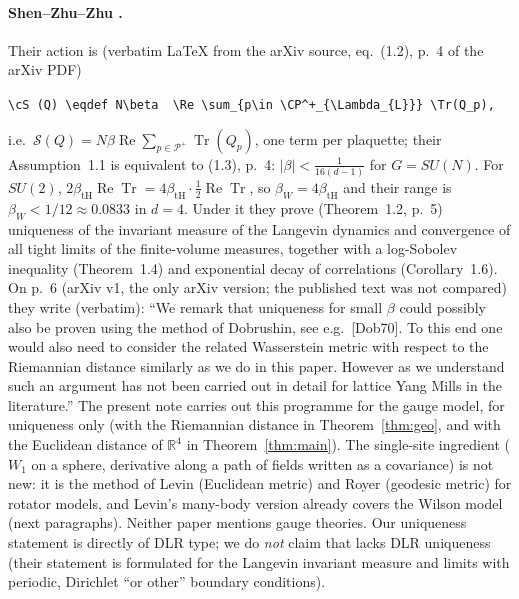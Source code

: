 \documentclass[11pt,a4paper]{article}
\theoremstyle{remark}
\theoremstyle{definition}
\newcommand{\R}{\mathbb{R}}
\newcommand{\ReTr}{\operatorname{Re}\operatorname{Tr}}
\begin{document}
\paragraph{Shen--Zhu--Zhu \cite{SZZ23}.} Their action is (verbatim LaTeX from the arXiv source, eq.~(1.2),
p.~4 of the arXiv PDF)
\begin{center}\small\verb|\cS (Q) \eqdef N\beta  \Re \sum_{p\in \CP^+_{\Lambda_{L}}} \Tr(Q_p),|\end{center}
i.e.\ $\mathcal S(Q)=N\beta\operatorname{Re}\sum_{p\in\mathcal P^+}\operatorname{Tr}(Q_p)$, one term per plaquette; their
Assumption~1.1 is equivalent to (1.3), p.~4: $|\beta|<\frac{1}{16(d-1)}$ for $G=SU(N)$. For $SU(2)$,
$2\beta_{\mathrm{tH}}\ReTr=4\beta_{\mathrm{tH}}\cdot\frac12\ReTr$, so $\beta_W=4\beta_{\mathrm{tH}}$ and their range is
$\beta_W<1/12\approx0.0833$ in $d=4$. Under it they prove (Theorem~1.2, p.~5) uniqueness of the invariant
measure of the Langevin dynamics and convergence of all tight limits of the finite-volume measures, together
with a log-Sobolev inequality (Theorem~1.4) and exponential decay of correlations (Corollary~1.6).
On p.~6 (arXiv v1, the only arXiv version; the published text was not compared) they write (verbatim): ``We remark that uniqueness for small $\beta$ could possibly also be proven
using the method of Dobrushin, see e.g.\ [Dob70]. To this end one would also need to consider the related
Wasserstein metric with respect to the Riemannian distance similarly as we do in this paper. However as we
understand such an argument has not been carried out in detail for lattice Yang Mills in the literature.''
The present note carries out this programme for the gauge model, for uniqueness only (with the Riemannian
distance in Theorem~\ref{thm:geo}, and with the Euclidean distance of $\R^4$ in Theorem~\ref{thm:main}). The
single-site ingredient ($W_1$ on a sphere, derivative along a path of fields written as a covariance) is not
new: it is the method of Levin \cite{Lev80} (Euclidean metric) and Royer \cite{Roy86} (geodesic metric) for
rotator models, and Levin's many-body version already covers the Wilson model (next paragraphs). Neither paper
mentions gauge theories.
Our uniqueness statement is directly of DLR type; we do \emph{not} claim that \cite{SZZ23} lacks DLR
uniqueness (their statement is formulated for the Langevin invariant measure and limits with periodic,
Dirichlet ``or other'' boundary conditions).
\end{document}
